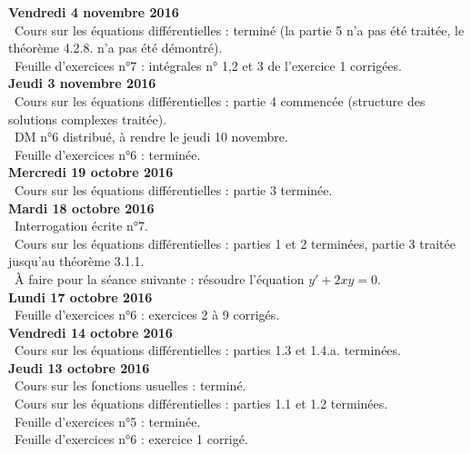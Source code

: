 \documentclass[12pt,a4paper]{article}
\begin{document}
\noindent\textbf{Vendredi 4 novembre 2016}\\
\bu\ Cours sur les équations différentielles : terminé (la partie 5 n'a pas été traitée, le théorème 4.2.8. n'a pas été démontré). \\
\bu\ Feuille d'exercices n°7 : intégrales n° 1,2 et 3 de l'exercice 1 corrigées.\vspace{.4cm}\\

\noindent\textbf{Jeudi 3 novembre 2016}\\
\bu\ Cours sur les équations différentielles : partie 4 commencée (structure des solutions complexes traitée). \\
\bu\ DM n°6 distribué, à rendre le jeudi 10 novembre. \\
\bu\ Feuille d'exercices n°6 : terminée.\vspace{.4cm}\\

\noindent\textbf{Mercredi 19 octobre 2016}\\
\bu\ Cours sur les équations différentielles : partie 3 terminée. \vspace{.4cm}\\

\noindent\textbf{Mardi 18 octobre 2016}\\
\bu\ Interrogation écrite n°7.\\
\bu\ Cours sur les équations différentielles : parties 1 et 2 terminées, partie 3 traitée jusqu'au théorème 3.1.1.\\
\bu\ À faire pour la séance suivante : résoudre l'équation $y'+2xy=0$. \vspace{.4cm}\\

\noindent\textbf{Lundi 17 octobre 2016}\\
\bu\ Feuille d'exercices n°6 : exercices 2 à 9 corrigés. \vspace{.4cm}\\

\noindent\textbf{Vendredi 14 octobre 2016}\\
\bu\ Cours sur les équations différentielles : parties 1.3 et 1.4.a. terminées. \vspace{.4cm}\\

\noindent\textbf{Jeudi 13 octobre 2016}\\
\bu\ Cours sur les fonctions usuelles : terminé.\\
\bu\ Cours sur les équations différentielles : parties 1.1 et 1.2 terminées. \\
\bu\ Feuille d'exercices n°5 : terminée.\\
\bu\ Feuille d'exercices n°6 : exercice 1 corrigé. \vspace{.4cm}\\
\end{document}
